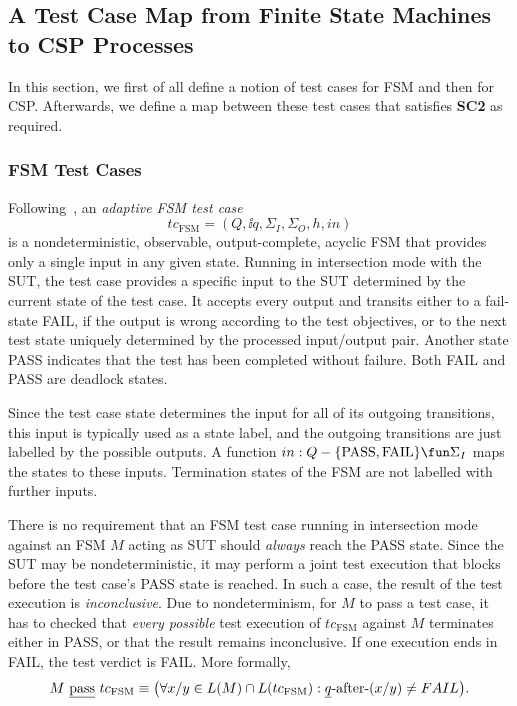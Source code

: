 \subsection{A Test Case Map from Finite State Machines to CSP Processes}
\label{sec:tcmap}

In this section, we first of all define a notion of test cases for FSM and
then for CSP. Afterwards, we define a map between these test cases that satisfies
{\bf SC2} as required.

\subsubsection*{FSM Test Cases}

Following~\cite{DBLP:conf/hase/PetrenkoY14},
an \emph{adaptive FSM test case}
$$
tc_\text{FSM}=(Q,\ii q,\Sigma_I,\Sigma_O,h,in)
$$
is a nondeterministic, observable, output-complete, acyclic FSM that provides
only a single input in any given state. Running in intersection mode with the
SUT, the test case provides a specific input to the SUT determined by the
current state of the test case. It accepts every output and transits either
to a fail-state FAIL, if the output is wrong according to the test
objectives, or to the next test state uniquely determined  by the processed
input/output pair. Another state PASS indicates that the test has been
completed without failure. Both FAIL and PASS are deadlock states.

Since the test case state determines the input for all of its outgoing transitions, this input is typically used as a state label, and the outgoing transitions are just labelled by the possible outputs. A function $in : Q -\{  \text{PASS}, \text{FAIL} \}
\fun\Sigma_I$ maps the states to these inputs. Termination states
of the FSM are not labelled with further inputs.

There is no requirement that an FSM test case running in intersection mode against
an FSM $M$ acting as SUT should {\it always} reach the PASS state. Since the SUT may be nondeterministic, it may perform a joint test execution that blocks before
the test case's PASS state is reached. In such a case, the result of the test execution is \emph{inconclusive}. Due to nondeterminism, for $M$ to pass a test case, it
has to checked that {\it every possible} test execution of  $tc_\text{FSM}$ against $M$
terminates either in PASS, or that the result remains inconclusive. If one execution ends in FAIL, the test verdict is FAIL. More formally,
$$
M\ \underline{\text{pass}}\ tc_\text{FSM} \equiv
\big(
\forall x/y \in L(M)\cap L(tc_\text{FSM}): \underline{q}\text{-after-}(x/y) \neq FAIL
\big).
$$

